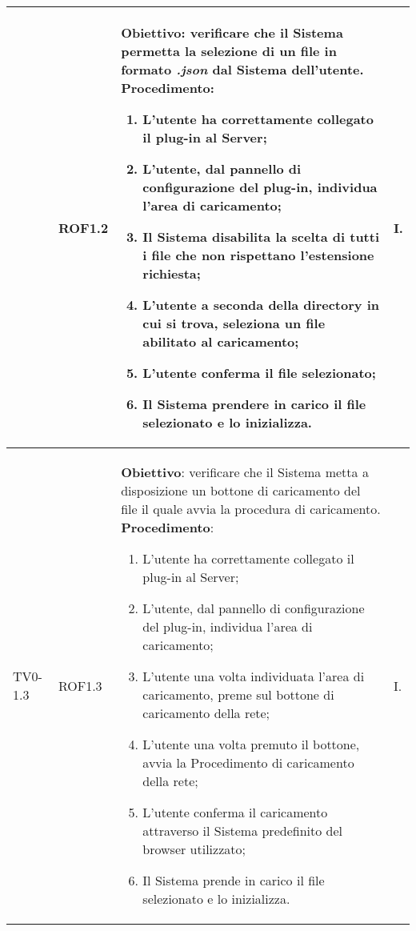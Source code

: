 \begin{longtable}{|C{.15\textwidth}|C{.13\textwidth}|m{.52\textwidth}|C{.08\textwidth}|}
   & ROF1.2 &
	\textbf{Obiettivo}: verificare che il Sistema permetta la selezione di un file in formato \textit{.json} dal Sistema dell'utente.\newline
	\textbf{Procedimento}:
	\begin{enumerate}
		\item L'utente ha correttamente collegato il plug-in al Server;
		\item L'utente, dal pannello di configurazione del plug-in, individua l'area di caricamento;
		\item Il Sistema disabilita la scelta di tutti i file che non rispettano l'estensione richiesta;
		\item L'utente a seconda della directory in cui si trova, seleziona un file abilitato al caricamento;
		\item L'utente conferma il file selezionato;
		\item Il Sistema prendere in carico il file selezionato e lo inizializza.
	\end{enumerate}
	& I. \\
\hline

 TV0-1.3 & ROF1.3 &
	\textbf{Obiettivo}: verificare che il Sistema metta a disposizione un bottone di caricamento del file il quale avvia la procedura di caricamento. \newline
	\textbf{Procedimento}:
	\begin{enumerate}
		\item L'utente ha correttamente collegato il plug-in al Server;
		\item L'utente, dal pannello di configurazione del plug-in, individua l'area di caricamento;
		\item L'utente una volta individuata l'area di caricamento, preme sul bottone di caricamento della rete;
		\item L'utente una volta premuto il bottone, avvia la Procedimento di caricamento della rete;
		\item L'utente conferma il caricamento attraverso il Sistema predefinito del browser utilizzato;
		\item Il Sistema prende in carico il file selezionato e lo inizializza.
	\end{enumerate}
	& I. \\
\hline


\end{longtable}
